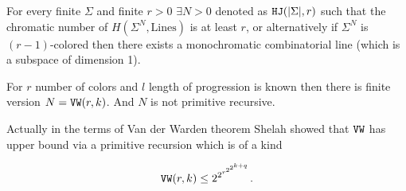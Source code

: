 \begin{thm}
	For every finite $\Sigma$ and finite $r > 0$ $\exists N > 0$ denoted as
	$\mathtt{HJ} (|\Sigma|, r)$ such that the chromatic number of $H(\Sigma^N,
	\text{Lines})$ is at least $r$, or alternatively if $\Sigma^N$ is
	$(r-1)$-colored then there exists a monochromatic combinatorial line
	(which is a subspace of dimension 1).
\end{thm}

\begin{thm}
	For $r$ number of colors and $l$ length of progression is known then
	there is finite version $N = \mathtt{VW}(r,k)$. And $N$ is not primitive
	recursive.
\end{thm}

Actually in the terms of Van der Warden theorem Shelah showed that $\mathtt{VW}$ has upper bound via a primitive recursion which is of a kind

$$
\mathtt{VW} (r,k) \leq 2^{2^{r^{2^{2^{k+q}}}}}.
$$

\newpage

